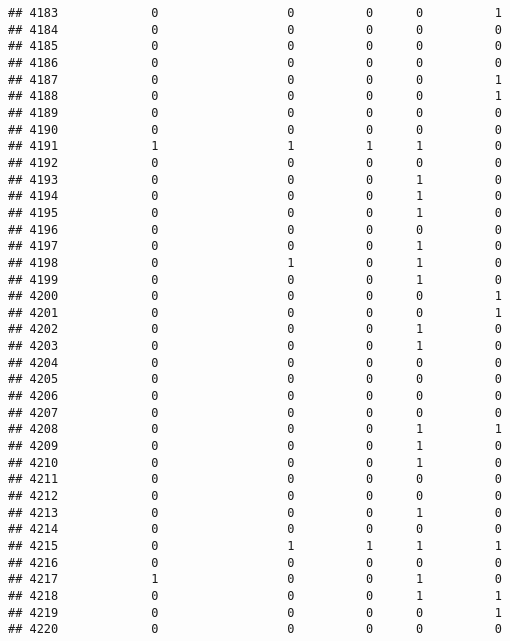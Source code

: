 \documentclass[
]{article}
\begin{document}
\begin{verbatim}
## 4183             0                  0          0      0          1
## 4184             0                  0          0      0          0
## 4185             0                  0          0      0          0
## 4186             0                  0          0      0          0
## 4187             0                  0          0      0          1
## 4188             0                  0          0      0          1
## 4189             0                  0          0      0          0
## 4190             0                  0          0      0          0
## 4191             1                  1          1      1          0
## 4192             0                  0          0      0          0
## 4193             0                  0          0      1          0
## 4194             0                  0          0      1          0
## 4195             0                  0          0      1          0
## 4196             0                  0          0      0          0
## 4197             0                  0          0      1          0
## 4198             0                  1          0      1          0
## 4199             0                  0          0      1          0
## 4200             0                  0          0      0          1
## 4201             0                  0          0      0          1
## 4202             0                  0          0      1          0
## 4203             0                  0          0      1          0
## 4204             0                  0          0      0          0
## 4205             0                  0          0      0          0
## 4206             0                  0          0      0          0
## 4207             0                  0          0      0          0
## 4208             0                  0          0      1          1
## 4209             0                  0          0      1          0
## 4210             0                  0          0      1          0
## 4211             0                  0          0      0          0
## 4212             0                  0          0      0          0
## 4213             0                  0          0      1          0
## 4214             0                  0          0      0          0
## 4215             0                  1          1      1          1
## 4216             0                  0          0      0          0
## 4217             1                  0          0      1          0
## 4218             0                  0          0      1          1
## 4219             0                  0          0      0          1
## 4220             0                  0          0      0          0

\end{verbatim}
\end{document}
